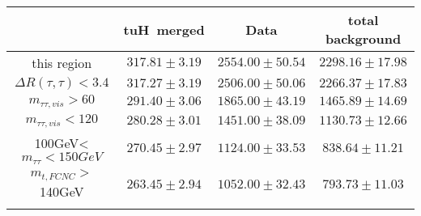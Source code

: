 \begin{tabular}{cccc} \toprule\toprule
 & tuH~merged & Data & total background\\\midrule
 this region & $317.81\pm3.19$ & $2554.00\pm50.54$ & $2298.16\pm17.98$\\
$\Delta R(\tau,\tau)<3.4$ & $317.27\pm3.19$ & $2506.00\pm50.06$ & $2266.37\pm17.83$\\
$m_{\tau\tau,vis}>60$ & $291.40\pm3.06$ & $1865.00\pm43.19$ & $1465.89\pm14.69$\\
$m_{\tau\tau,vis}<120$ & $280.28\pm3.01$ & $1451.00\pm38.09$ & $1130.73\pm12.66$\\
100GeV<$m_{\tau\tau}<150GeV$ & $270.45\pm2.97$ & $1124.00\pm33.53$ & $838.64\pm11.21$\\
$m_{t,FCNC}>$140GeV & $263.45\pm2.94$ & $1052.00\pm32.43$ & $793.73\pm11.03$\\
\bottomrule\bottomrule\\
\end{tabular}

